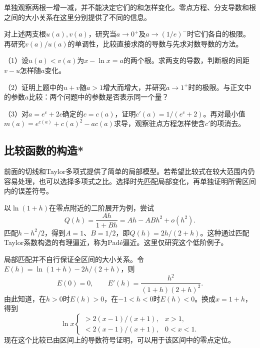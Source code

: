 单独观察两根一增一减，并不能决定它们的和怎样变化。零点方程、分支导数和根之间的大小关系在这里分别提供了不同的信息。

\begin{example}
对上述两支根\(u(a),v(a)\)，研究当\(a\to0^+\)及\(a\to(1/e)^-\)时它们各自的极限。再研究\(v(a)/u(a)\)的单调性，比较直接求商的导数与先求对数导数的方法。
\end{example}

\begin{exercise}
\mbox{}\par\nobreak

（1）设\(u(a)<v(a)\)为\(x-\ln x=a\)的两个根。求两支的导数，判断根的间距\(v-u\)怎样随\(a\)变化。

（2）证明上题中的\(u+v\)随\(a>1\)增大而增大，并研究\(a\to1^+\)时的极限。与正文中的参数\(a\)比较：两个问题中的参数是否表示同一个量？

（3）对\(a=e^c+2c\)确定的\(c=c(a)\)，证明\(c'(a)=1/(e^c+2)\)。再对最小值\(m(a)=e^{c(a)}+c(a)^2-ac(a)\)求导，观察驻点方程怎样使含\(c'\)的项消去。
\end{exercise}

\subsection{比较函数的构造*}

前面的切线和Taylor多项式提供了简单的局部模型。若希望比较式在较大范围内仍容易处理，也可以选择多项式之比。选择时先匹配局部变化，再单独证明所需区间内的误差符号。

以\(\ln(1+h)\)在零点附近的二阶展开为例，尝试
\begin{equation*}
 Q(h)=\frac{Ah}{1+Bh}=Ah-ABh^2+o(h^2).
\end{equation*}
匹配\(h-h^2/2\)，得到\(A=1\)、\(B=1/2\)，即\(Q(h)=2h/(2+h)\)。这种通过匹配Taylor系数构造的有理逼近，称为Padé逼近。这里仅研究这个低阶例子。

局部匹配并不自行保证全区间的大小关系。令\(E(h)=\ln(1+h)-2h/(2+h)\)，则
\begin{equation*}
 E(0)=0,\qquad E'(h)=\frac{h^2}{(1+h)(2+h)^2}.
\end{equation*}
由此知道，在\(h>0\)时\(E(h)>0\)，在\(-1<h<0\)时\(E(h)<0\)。换成\(x=1+h\)，得到
\begin{equation*}
 \ln x\begin{cases}
 >2(x-1)/(x+1),&x>1,\\
 <2(x-1)/(x+1),&0<x<1.
 \end{cases}
\end{equation*}
现在这个比较已由区间上的导数符号证明，可以用于该区间中的零点定位。

